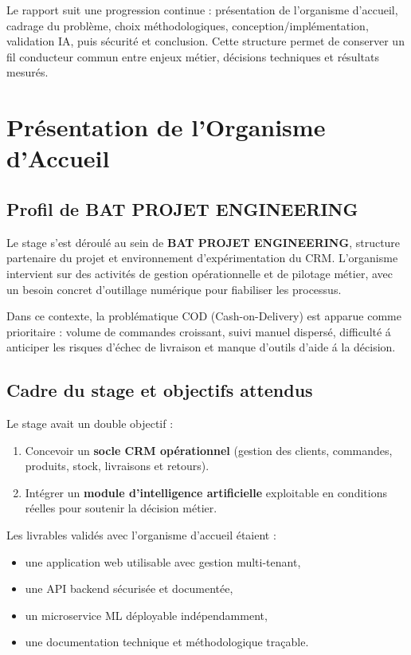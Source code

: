 \documentclass[12pt,a4paper]{report}
\begin{document}
Le rapport suit une progression continue : pr\'{e}sentation de l'organisme d'accueil, cadrage du probl\`{e}me, choix m\'{e}thodologiques, conception/impl\'{e}mentation, validation IA, puis s\'{e}curit\'{e} et conclusion. Cette structure permet de conserver un fil conducteur commun entre enjeux m\'{e}tier, d\'{e}cisions techniques et r\'{e}sultats mesur\'{e}s.


\chapter{Pr\'{e}sentation de l'Organisme d'Accueil}

\section{Profil de BAT PROJET ENGINEERING}

Le stage s'est d\'{e}roul\'{e} au sein de \textbf{BAT PROJET ENGINEERING}, structure partenaire du projet et environnement d'exp\'{e}rimentation du CRM. L'organisme intervient sur des activit\'{e}s de gestion op\'{e}rationnelle et de pilotage m\'{e}tier, avec un besoin concret d'outillage num\'{e}rique pour fiabiliser les processus.

Dans ce contexte, la probl\'{e}matique COD (Cash-on-Delivery) est apparue comme prioritaire : volume de commandes croissant, suivi manuel dispers\'{e}, difficult\'{e} \'{a} anticiper les risques d'\'{e}chec de livraison et manque d'outils d'aide \'{a} la d\'{e}cision.

\section{Cadre du stage et objectifs attendus}

Le stage avait un double objectif :
\begin{enumerate}
  \item Concevoir un \textbf{socle CRM op\'{e}rationnel} (gestion des clients, commandes, produits, stock, livraisons et retours).
  \item Int\'{e}grer un \textbf{module d'intelligence artificielle} exploitable en conditions r\'{e}elles pour soutenir la d\'{e}cision m\'{e}tier.
\end{enumerate}

Les livrables valid\'{e}s avec l'organisme d'accueil \'{e}taient :
\begin{itemize}
  \item une application web utilisable avec gestion multi-tenant,
  \item une API backend s\'{e}curis\'{e}e et document\'{e}e,
  \item un microservice ML d\'{e}ployable ind\'{e}pendamment,
  \item une documentation technique et m\'{e}thodologique tra\c{c}able.
\end{itemize}
\end{document}
